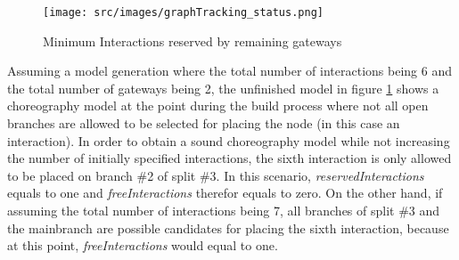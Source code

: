 \begin{figure}[H]
\texttt{[image: src/images/graphTracking\_status.png]}
\caption{Minimum Interactions reserved by remaining gateways}
\label{fig:graphTracking3}
\end{figure}

Assuming a model generation where the total number of interactions being 6 and the total number of gateways being 2, the unfinished model in figure \ref{fig:graphTracking3} shows a choreography model at the point during the build process where not all open branches are allowed to be selected for placing the node (in this case an interaction). In order to obtain a sound choreography model while not increasing the number of initially specified interactions, the sixth interaction is only allowed to be placed on branch \#2 of split \#3. In this scenario, \textit{reservedInteractions} equals to one and \textit{freeInteractions} therefor equals to zero. On the other hand, if assuming the total number of interactions being 7, all branches of split \#3 and the mainbranch are possible candidates for placing the sixth interaction, because at this point, \textit{freeInteractions} would equal to one. \\

